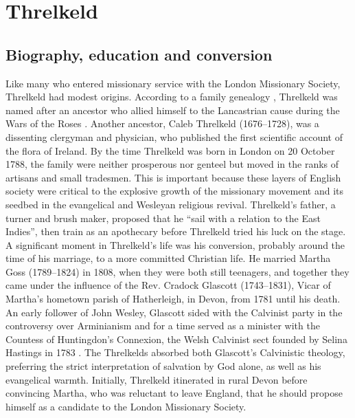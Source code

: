 \section{Threlkeld}

\subsection{Biography, education and conversion}

Like many who entered missionary service with the London Missionary Society, Threlkeld had modest origins. According to a family genealogy \citep{threlkeld_family_genius_1767}, Threlkeld was named after an ancestor who allied himself to the Lancastrian cause during the Wars of the Roses \citep[15]{gunson_australian_1974a}. Another ancestor, Caleb Threlkeld (1676--1728), was a dissenting clergyman and physician, who published the first scientific account of the flora of Ireland. By the time Threlkeld was born in London on 20 October 1788, the family were neither prosperous nor genteel but moved in the ranks of artisans and small tradesmen. This is important because these layers of English society were critical to the explosive growth of the missionary movement and its seedbed in the evangelical and Wesleyan religious revival. Threlkeld’s father, a turner and brush maker, proposed that he “sail with a relation to the East Indies”, then train as an apothecary before Threlkeld tried his luck on the stage. A significant moment in Threlkeld’s life was his conversion, probably around the time of his marriage, to a more committed Christian life. He married Martha Goss (1789--1824) in 1808, when they were both still teenagers, and together they came under the influence of the Rev. Cradock Glascott (1743--1831), Vicar of Martha’s hometown parish of Hatherleigh, in Devon, from 1781 until his death. An early follower of John Wesley, Glascott sided with the Calvinist party in the controversy over Arminianism and for a time served as a minister with the Countess of Huntingdon’s Connexion, the Welsh Calvinist sect founded by Selina Hastings in 1783 \citep{harding_countess_2003}. The Threlkelds absorbed both Glascott’s Calvinistic theology, preferring the strict interpretation of salvation by God alone, as well as his evangelical warmth. Initially, Threlkeld itinerated in rural Devon before convincing Martha, who was reluctant to leave England, that he should propose himself as a candidate to the London Missionary Society.


